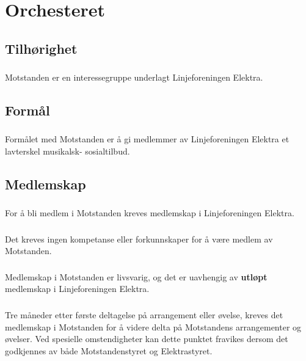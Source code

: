 \documentclass{article}
\newenvironment{statute}[1][]
    {
        \titleformat{\subsubsection}[runin]{\normalfont}{\hspace{1pt}\textit{\S\hspace{5pt}\thesubsubsection}}{0pt}{\rule{4pt}{0pt}}{}
        \subsubsection{}#1
        \begin{minipage}[t]{0.9\linewidth}
    }
    {
        \end{minipage}
        
        \ignorespacesafterend
    }
\begin{document}
    \section{Orchesteret}
        \subsection{Tilhørighet}
            \begin{statute}
                Motstanden er en interessegruppe underlagt Linjeforeningen Elektra.
            \end{statute}
        
        \subsection{Formål}
            \begin{statute}
                Formålet med Motstanden er å gi medlemmer av Linjeforeningen Elektra et lavterskel musikalsk- sosialtilbud.
        \end{statute}
        
        
        \subsection{Medlemskap}\label{medlemskap}
            \begin{statute}
                For å bli medlem i Motstanden kreves medlemskap i Linjeforeningen Elektra.
            \end{statute}
            \begin{statute}
                Det kreves ingen kompetanse eller forkunnskaper for å være medlem av Motstanden.
            \end{statute}
            \begin{statute}
                Medlemskap i Motstanden er livsvarig, og det er uavhengig av \textbf{utløpt} medlemskap i Linjeforeningen Elektra.            
            \end{statute}
        	\begin{statute}
        		Tre måneder etter første deltagelse på arrangement eller øvelse, kreves det medlemskap i 
        		Motstanden for å videre delta på Motstandens arrangementer og øvelser. Ved spesielle omstendigheter kan dette punktet fravikes dersom det godkjennes av både Motstandenstyret og Elektrastyret. 
        	\end{statute}
        
\end{document}
